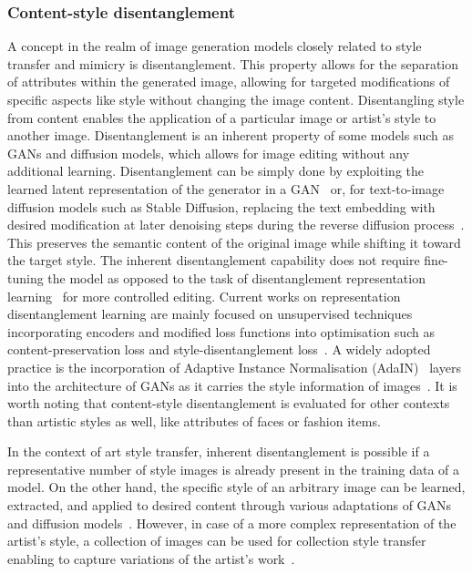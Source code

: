 \documentclass[conference,table]{IEEEtran}
\begin{document}
\subsubsection{Content-style disentanglement}
A concept in the realm of image generation models closely related to style transfer and mimicry is disentanglement. This property allows for the separation of attributes within the generated image, allowing for targeted modifications of specific aspects like style without changing the image content. Disentangling style from content enables the application of a particular image or artist's style to another image.
Disentanglement is an inherent property of some models such as GANs and diffusion models, which allows for image editing without any additional learning. Disentanglement can be simply done by exploiting the learned latent representation of the generator in a GAN~\cite{collins_editing_2020, harkonen_ganspace_2020} or, for text-to-image diffusion models such as Stable Diffusion, replacing the text embedding with desired modification at later denoising steps during the reverse diffusion process~\cite{wu_uncovering_2023}. This preserves the semantic content of the original image while shifting it toward the target style. The inherent disentanglement capability does not require fine-tuning the model as opposed to the task of disentanglement representation learning~\cite{higgins_towards_2018} for more controlled editing. 
Current works on representation disentanglement learning are mainly focused on unsupervised techniques incorporating encoders and modified loss functions into optimisation such as content-preservation loss and style-disentanglement loss~\cite{yang_disdiff_2023, wang_stylediffusion_2023, kwon_diffusion-based_2023, kazemi_style_2018}.
A widely adopted practice is the incorporation of Adaptive Instance Normalisation (AdaIN)~\cite{huang_arbitrary_2017} layers into the architecture of GANs as it carries the style information of images~\cite{kazemi_style_2018, kwon_diagonal_2021, xu_drb-gan_2021}.
It is worth noting that content-style disentanglement is evaluated for other contexts than artistic styles as well, like attributes of faces or fashion items.

In the context of art style transfer, inherent disentanglement is possible if a representative number of style images is already present in the training data of a model. On the other hand, the specific style of an arbitrary image can be learned, extracted, and applied to desired content through various adaptations of GANs~\cite{kaneko_cyclegan-vc2_2019, liu_artsy-gan_2018, kazemi_style_2018} and diffusion models~\cite{wang_stylediffusion_2023, wu_not_2023}. However, in case of a more complex representation of the artist's style, a collection of images can be used for collection style transfer enabling to capture variations of the artist's work~\cite{kotovenko_content_2019, xu_drb-gan_2021}.
\end{document}
